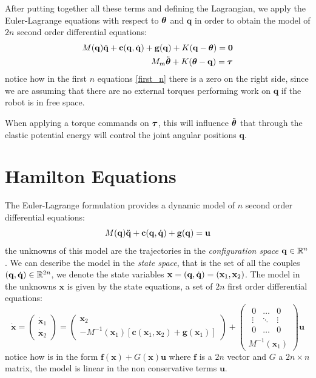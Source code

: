 \documentclass[10pt, a4paper]{report}
\newcommand{\q}{{\mathbf q}}
\begin{document}
After putting together all these terms and defining the Lagrangian, we apply the Euler-Lagrange equations with respect to ${\boldsymbol{\theta}}$ and $\q$ in order to obtain the model of $2n$ second order differential equations:\begin{align}
    \label{first_n}M(\q)\ddq+\mathbf c(\q,\dq)+\mathbf g(\q)+K(\q-\btheta)=\mathbf 0&\\ 
    M_m\ddot{\btheta}+K(\btheta-\q)=\btau&
\end{align}
notice how in the first $n$ equations \eqref{first_n} there is a zero on the right side, since we are assuming that there are no external torques performing work on $\q$ if the robot is in free space.

When applying a torque commands on ${\boldsymbol{\tau}}$, this will influence $\ddot{{\boldsymbol{\theta}}}$ that through the elastic potential energy will control the joint angular positions $\q$.
\section{Hamilton Equations}\label{StateDescription}
The Euler-Lagrange formulation provides a dynamic model of $n$ second order differential equations:\begin{equation}\label{model_in_conf}
    M(\q)\ddq+\mathbf c(\q,\dq)+\mathbf g(\q)=\mathbf u 
\end{equation}
the unknowns of this model are the trajectories in the \textit{configuration space} $\q\in \R^n$. We can describe the model in the \textit{state space}, that is the set of all the couples $(\q,\dq)\in \R^{2n}$, we denote the state variables $\mathbf x=(\q,\dq)=(\mathbf x_1,\mathbf x_2)$. The model in the unknowns $\mathbf x$ is given by the state equations, a set of $2n$ first order differential equations:\begin{equation}
    \dot{\mathbf x}=\begin{pmatrix}
        \dot{\mathbf x}_1\\ 
        \dot{\mathbf x}_2
    \end{pmatrix}=\begin{pmatrix}
        \mathbf x_2\\ 
        -M^{-1}(\mathbf x_1)[\mathbf c(\mathbf x_1,\mathbf x_2)+\mathbf g(\mathbf x_1)]
    \end{pmatrix}+\begin{pmatrix}
        \begin{matrix}
        0&\dots&0\\
        \vdots&\ddots&\vdots\\
        0&\dots&0
        \end{matrix}\\ M^{-1}(\mathbf x_1)
    \end{pmatrix}\mathbf u
\end{equation}
notice how is in the form $\mathbf f(\mathbf x)+G(\mathbf x)\mathbf u$ where $\mathbf f$ is a $2n$ vector and $G$ a $2n\times n$ matrix, the model is linear in the non conservative terms $\mathbf u$.
\end{document}
